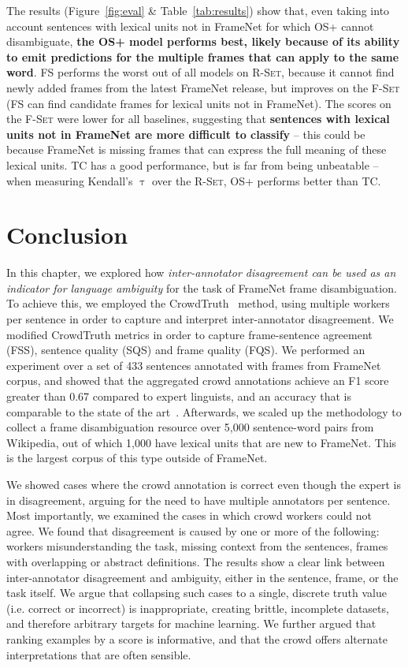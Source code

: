 The results (Figure~\ref{fig:eval} \& Table~\ref{tab:results}) show that, even taking into account sentences with lexical units not in FrameNet for which OS+ cannot disambiguate, \textbf{the OS+ model performs best, likely because of its ability to emit predictions for the multiple frames that can apply to the same word}. FS performs the worst out of all models on \textsc{R-Set}, because it cannot find newly added frames from the latest FrameNet release, but improves on the \textsc{F-Set} (FS can find candidate frames for lexical units not in FrameNet). The scores on the \textsc{F-Set} were lower for all baselines, suggesting that \textbf{sentences with lexical units not in FrameNet are more difficult to classify} -- this could be because FrameNet is missing frames that can express the full meaning of these lexical units. TC has a good performance, but is far from being unbeatable -- when measuring Kendall's $\uptau$ over the \textsc{R-Set}, OS+ performs better than TC.



\section{Conclusion}

In this chapter, we explored how \emph{inter-annotator disagreement can be used as an indicator for language ambiguity} for the task of FrameNet frame disambiguation. To achieve this, we employed the CrowdTruth~\cite{aroyo2014threesides} method, using multiple workers per sentence in order to capture and interpret inter-annotator disagreement. We modified CrowdTruth metrics in order to capture frame-sentence agreement (FSS), sentence quality (SQS) and frame quality (FQS). We performed an experiment over a set of 433 sentences annotated with frames from FrameNet corpus, and showed that the aggregated crowd annotations achieve an F1 score greater than 0.67 compared to expert linguists, and an accuracy that is comparable to the state of the art~\cite{Hong:2011:GCR:2018966.2018970}. Afterwards, we scaled up the methodology to collect a frame disambiguation resource over 5,000 sentence-word pairs from Wikipedia, out of which 1,000 have lexical units that are new to FrameNet. This is the largest corpus of this type outside of FrameNet.

We showed cases where the crowd annotation is correct even though the expert is in disagreement, arguing for the need to have multiple annotators per sentence. Most importantly, we examined the cases in which crowd workers could not agree. We found that disagreement is caused by one or more of the following: workers misunderstanding the task, missing context from the sentences, frames with overlapping or abstract definitions. The results show a clear link between inter-annotator disagreement and ambiguity, either in the sentence, frame, or the task itself. We argue that collapsing such cases to a single, discrete truth value (i.e. correct or incorrect) is inappropriate, creating brittle, incomplete datasets, and therefore arbitrary targets for machine learning.  We further argued that ranking examples by a score is informative, and that the crowd offers alternate interpretations that are often sensible.

